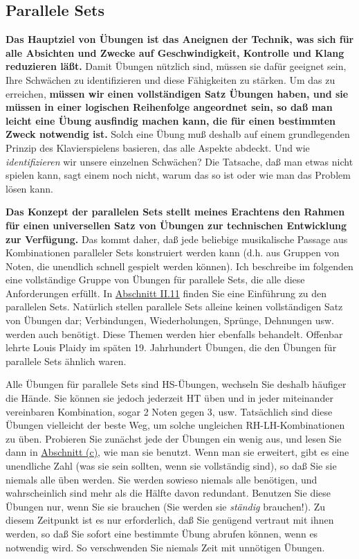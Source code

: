 
\subsection{Parallele Sets}\hypertarget{c1iii7b}{}

\textbf{Das Hauptziel von Übungen ist das Aneignen der Technik, was sich für alle Absichten und Zwecke auf Geschwindigkeit, Kontrolle und Klang reduzieren läßt.}
Damit Übungen nützlich sind, müssen sie dafür geeignet sein, Ihre Schwächen zu identifizieren und diese Fähigkeiten zu stärken.
Um das zu erreichen, \textbf{müssen wir einen vollständigen Satz Übungen haben, und sie müssen in einer logischen Reihenfolge angeordnet sein, so daß man leicht eine Übung ausfindig machen kann, die für einen bestimmten Zweck notwendig ist.}
Solch eine Übung muß deshalb auf einem grundlegenden Prinzip des Klavierspielens basieren, das alle Aspekte abdeckt.
Und wie \textit{identifizieren} wir unsere einzelnen Schwächen?
Die Tatsache, daß man etwas nicht spielen kann, sagt einem noch nicht, warum das so ist oder wie man das Problem lösen kann.

\textbf{Das Konzept der parallelen Sets stellt meines Erachtens den Rahmen für einen universellen Satz von Übungen zur technischen Entwicklung zur Verfügung.}
Das kommt daher, daß jede beliebige musikalische Passage aus Kombinationen paralleler Sets konstruiert werden kann (d.h. aus Gruppen von Noten, die unendlich schnell gespielt werden können).
Ich beschreibe im folgenden eine vollständige Gruppe von Übungen für parallele Sets, die alle diese Anforderungen erfüllt.
In \hyperlink{c1ii11}{Abschnitt II.11} finden Sie eine Einführung zu den parallelen Sets.
Natürlich stellen parallele Sets alleine keinen vollständigen Satz von Übungen dar; Verbindungen, Wiederholungen, Sprünge, Dehnungen usw. werden auch benötigt.
Diese Themen werden hier ebenfalls behandelt.
Offenbar lehrte Louis Plaidy im späten 19. Jahrhundert Übungen, die den Übungen für parallele Sets ähnlich waren.

Alle Übungen für parallele Sets sind HS-Übungen, wechseln Sie deshalb häufiger die Hände.
Sie können sie jedoch jederzeit HT üben und in jeder miteinander vereinbaren Kombination, sogar 2 Noten gegen 3, usw.
Tatsächlich sind diese Übungen vielleicht der beste Weg, um solche ungleichen RH-LH-Kombinationen zu üben.
Probieren Sie zunächst jede der Übungen ein wenig aus, und lesen Sie dann in \hyperlink{c1iii7c}{Abschnitt (c)}, wie man sie benutzt.
Wenn man sie erweitert, gibt es eine unendliche Zahl (was sie sein sollten, wenn sie vollständig sind), so daß Sie sie niemals alle üben werden.
Sie werden sowieso niemals alle benötigen, und wahrscheinlich sind mehr als die Hälfte davon redundant.
Benutzen Sie diese Übungen nur, wenn Sie sie brauchen (Sie werden sie \textit{ständig} brauchen!).
Zu diesem Zeitpunkt ist es nur erforderlich, daß Sie genügend vertraut mit ihnen werden, so daß Sie sofort eine bestimmte Übung abrufen können, wenn es notwendig wird.
So verschwenden Sie niemals Zeit mit unnötigen Übungen.


